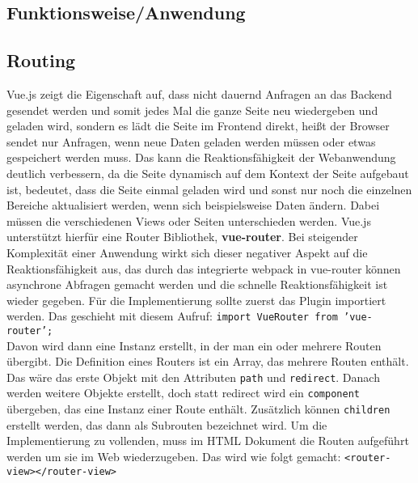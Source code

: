  \subsection{Funktionsweise/Anwendung}
\subsection*{Routing}
Vue.js zeigt die Eigenschaft auf, dass nicht dauernd Anfragen an das Backend gesendet werden und somit jedes Mal die ganze Seite neu wiedergeben und geladen wird, sondern es l\"adt die Seite im Frontend direkt, hei\ss{}t der Browser sendet nur Anfragen, wenn neue Daten geladen werden m\"ussen oder etwas gespeichert werden muss. 
Das kann die Reaktionsf\"ahigkeit der Webanwendung deutlich verbessern, da die Seite dynamisch auf dem Kontext der Seite aufgebaut ist, bedeutet, dass die Seite einmal geladen wird und sonst nur noch die einzelnen Bereiche aktualisiert werden, wenn sich beispielsweise Daten \"andern. Dabei m\"ussen die verschiedenen Views oder Seiten unterschieden werden. Vue.js unterst\"utzt hierf\"ur eine Router Bibliothek, \textbf{vue-router}\cite{Zynda2017}. Bei steigender Komplexit\"at einer Anwendung wirkt sich dieser negativer Aspekt auf die Reaktionsf\"ahigkeit aus, das durch das integrierte webpack in vue-router k\"onnen asynchrone Abfragen gemacht werden und die schnelle Reaktionsf\"ahigkeit ist wieder gegeben.
F\"ur die Implementierung sollte zuerst das Plugin importiert werden. Das geschieht mit diesem Aufruf:
\texttt{import VueRouter from 'vue-router';}\\
Davon wird dann eine Instanz erstellt, in der man ein oder mehrere Routen \"ubergibt. Die Definition eines Routers ist ein Array, das mehrere Routen enth\"alt. 
Das w\"are das erste Objekt mit den Attributen \texttt{path} und \texttt{redirect}. Danach werden weitere Objekte erstellt, doch statt redirect wird ein \texttt{component} \"ubergeben, das eine Instanz einer Route enth\"alt. Zus\"atzlich k\"onnen \texttt{children} erstellt werden, das dann als Subrouten bezeichnet wird. 
Um die Implementierung zu vollenden, muss im \ac{HTML} Dokument die Routen aufgef\"uhrt werden um sie im Web wiederzugeben. Das wird wie folgt gemacht:  \texttt{<router-view></router-view>}\cite{Bemenderfer2017}

